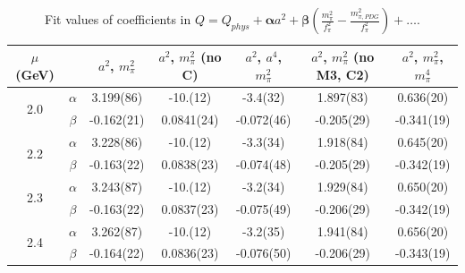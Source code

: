 \documentclass[12pt]{extarticle}
\begin{document}
\begin{table}[h!]
\begin{center}
\begin{tabular}{|c c|c|c|c|c|c|}
\hline
$\mu$ (GeV) &  & $a^2$, $m_\pi^2$& $a^2$, $m_\pi^2$ (no C)& $a^2$, $a^4$, $m_\pi^2$& $a^2$, $m_\pi^2$ (no M3, C2)& $a^2$, $m_\pi^2$, $m_\pi^4$\\
\hline
\multirow{2}{0.5in}{2.0} & $\alpha$ & 3.199(86)& -10.(12)& -3.4(32)& 1.897(83)& 0.636(20)\\
 & $\beta$ & -0.162(21)& 0.0841(24)& -0.072(46)& -0.205(29)& -0.341(19)\\
\hline
\multirow{2}{0.5in}{2.2} & $\alpha$ & 3.228(86)& -10.(12)& -3.3(34)& 1.918(84)& 0.645(20)\\
 & $\beta$ & -0.163(22)& 0.0838(23)& -0.074(48)& -0.205(29)& -0.342(19)\\
\hline
\multirow{2}{0.5in}{2.3} & $\alpha$ & 3.243(87)& -10.(12)& -3.2(34)& 1.929(84)& 0.650(20)\\
 & $\beta$ & -0.163(22)& 0.0837(23)& -0.075(49)& -0.206(29)& -0.342(19)\\
\hline
\multirow{2}{0.5in}{2.4} & $\alpha$ & 3.262(87)& -10.(12)& -3.2(35)& 1.941(84)& 0.656(20)\\
 & $\beta$ & -0.164(22)& 0.0836(23)& -0.076(50)& -0.206(29)& -0.343(19)\\
\hline
\end{tabular}
\caption{Fit values of coefficients in $Q = Q_{phys} + \mathbf{\alpha} a^2 + \mathbf{\beta}\left(\frac{m_\pi^2}{f_\pi^2}-\frac{m_{\pi,PDG}^2}{f_\pi^2}\right) + \ldots$.}
\end{center}
\end{table}




















\clearpage
\end{document}
